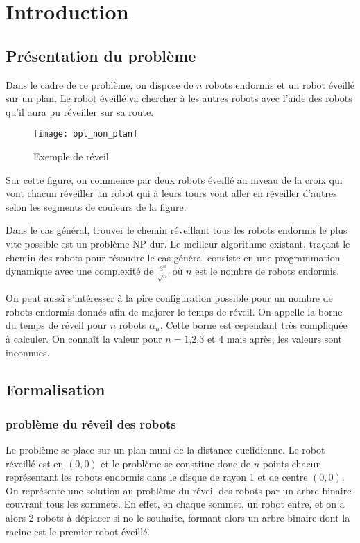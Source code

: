 \section{Introduction}

\subsection{Présentation du problème}

Dans le cadre de ce problème, on dispose de $n$ robots endormis et un robot éveillé sur un plan. Le robot éveillé va chercher à les autres robots avec l'aide des robots qu'il aura pu réveiller sur sa route.

\begin{figure}[h!]
  \centering
  \texttt{[image: opt\_non\_plan]}
  \caption{Exemple de réveil}
  \label{fig:opt_non_plan}
\end{figure}

Sur cette figure, on commence par deux robots éveillé au niveau de la croix qui vont chacun réveiller un robot qui à leurs tours vont aller en réveiller d'autres selon les segments de couleurs de la figure.

Dans le cas général, trouver le chemin réveillant tous les robots endormis le plus vite possible est un problème NP-dur. Le meilleur algorithme existant, traçant le chemin des robots pour résoudre le cas général consiste en une programmation dynamique avec une complexité de $\frac{3^n}{\sqrt{n}}$ où $n$ est le nombre de robots endormis.

On peut aussi s'intéresser à la pire configuration possible pour un nombre de robots endormis donnés afin de majorer le temps de réveil. On appelle la borne du temps de réveil pour $n$ robots $\alpha_n$. Cette borne est cependant très compliquée à calculer. On connaît la valeur pour $n = 1$,$2$,$3$ et $4$ mais après, les valeurs sont inconnues.
\subsection{Formalisation}

\subsubsection{problème du réveil des robots}

Le problème se place sur un plan muni de la distance euclidienne. Le robot réveillé est en $(0,0)$ et le problème se constitue donc de $n$ points chacun représentant les robots endormis dans le disque de rayon 1 et de centre $(0,0)$. On représente une solution au problème du réveil des robots par un arbre binaire couvrant tous les sommets. En effet, en chaque sommet, un robot entre, et on a alors 2 robots à déplacer si no le souhaite, formant alors un arbre binaire dont la racine est le premier robot éveillé.

